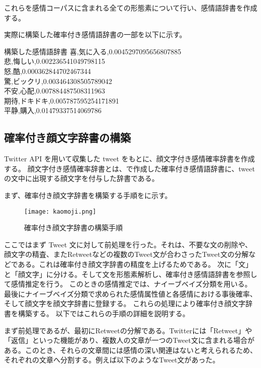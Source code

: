 \documentclass[11pt,a4j]{jsarticle}
\begin{document}
 これらを感情コーパスに含まれる全ての形態素について行い、感情語辞書を作成する。
 

実際に構築した確率付き感情語辞書の一部を以下に示す。

\begin{itembox}[h]{構築した感情語辞書}
   喜,気に入る,0.0045297095656807885\\
   悲,悔しい,0.002236541049798115\\
   怒,酷,0.000362844702467344\\
   驚,ビックリ,0.003464308505789042\\
   不安,心配,0.007884487508311963\\
   期待,ドキドキ,0.005787595254171891\\
   平静,購入,0.01479337514069786\\
\end{itembox}


  \subsection{確率付き顔文字辞書の構築}\label{sec:kaomojidic}
Twitter API を用いて収集した tweet をもとに、顔文字付き感情確率辞書を作成する。
顔文字付き感情確率辞書とは、で作成した確率付き感情語辞書に、tweet の文中に出現する顔文字を付与した辞書である。

まず、確率付き顔文字辞書を構築する手順をに示す。

\begin{figure}[h]
  \texttt{[image: kaomoji.png]}
  \caption{確率付き顔文字辞書の構築手順}
  \label{fig:kaomoji}
\end{figure}

ここではまず Tweet 文に対して前処理を行った。それは、不要な文の削除や、顔文字の精査、またRetweetなどの複数のTweet文が合わさったTweet文の分解などである。これは確率付き顔文字辞書の精度を上げるためである。
次に「文」と「顔文字」に分ける。そして文を形態素解析し、確率付き感情語辞書を参照して感情推定を行う。
このときの感情推定では、ナイーブベイズ分類を用いる。
最後にナイーブベイズ分類で求められた感情属性値と各感情における事後確率、そして顔文字を顔文字辞書に登録する。
これらの処理により確率付き顔文字辞書を構築する。
以下ではこれらの手順の詳細を説明する。

まず前処理であるが、最初にRetweetの分解である。Twitterには「Retweet」や「返信」といった機能があり、複数人の文章が一つのTweet文に含まれる場合がある。このとき、それらの文章間には感情の深い関連はないと考えられるため、それぞれの文章へ分割する。例えば以下のようなTweet文があった。
\end{document}
